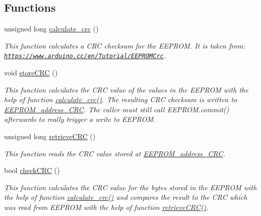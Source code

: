 \subsection*{Functions}
\begin{DoxyCompactItemize}
\item 
unsigned long \hyperlink{WIFIOnOff_8ino_a16ef77fe42b6e5a700dd2445f0aaa24f}{calculate\-\_\-crc} ()
\begin{DoxyCompactList}\small\item\em This function calculates a C\-R\-C checksum for the E\-E\-P\-R\-O\-M. It is taken from\-: \href{https://www.arduino.cc/en/Tutorial/EEPROMCrc}{\tt https\-://www.\-arduino.\-cc/en/\-Tutorial/\-E\-E\-P\-R\-O\-M\-Crc}. \end{DoxyCompactList}\item 
void \hyperlink{WIFIOnOff_8ino_a1dd9db8c49797d8536247d1fba49cfe7}{store\-C\-R\-C} ()
\begin{DoxyCompactList}\small\item\em This function calculates the C\-R\-C value of the values in the E\-E\-P\-R\-O\-M with the help of function \hyperlink{WIFIOnOff_8ino_a16ef77fe42b6e5a700dd2445f0aaa24f}{calculate\-\_\-crc()}. The resulting C\-R\-C checksum is written to \hyperlink{WIFIOnOff_8ino_ab384daae78d017828d89c6d9c697021a}{E\-E\-P\-R\-O\-M\-\_\-address\-\_\-\-C\-R\-C}. The caller must still call E\-E\-P\-R\-O\-M.\-commit() afterwards to really trigger a write to E\-E\-P\-R\-O\-M. \end{DoxyCompactList}\item 
unsigned long \hyperlink{WIFIOnOff_8ino_a80ac0ebe45e95ee7e439f2aeea333124}{retrieve\-C\-R\-C} ()
\begin{DoxyCompactList}\small\item\em This function reads the C\-R\-C value stored at \hyperlink{WIFIOnOff_8ino_ab384daae78d017828d89c6d9c697021a}{E\-E\-P\-R\-O\-M\-\_\-address\-\_\-\-C\-R\-C}. \end{DoxyCompactList}\item 
bool \hyperlink{WIFIOnOff_8ino_aeeada0076ef68a04f4794f91e727ae5a}{check\-C\-R\-C} ()
\begin{DoxyCompactList}\small\item\em This function calculates the C\-R\-C value for the bytes stored in the E\-E\-P\-R\-O\-M with the help of function \hyperlink{WIFIOnOff_8ino_a16ef77fe42b6e5a700dd2445f0aaa24f}{calculate\-\_\-crc()} and compares the result to the C\-R\-C which was read from E\-E\-P\-R\-O\-M with the help of function \hyperlink{WIFIOnOff_8ino_a80ac0ebe45e95ee7e439f2aeea333124}{retrieve\-C\-R\-C()}. \end{DoxyCompactList}\item 

\end{DoxyCompactItemize}
